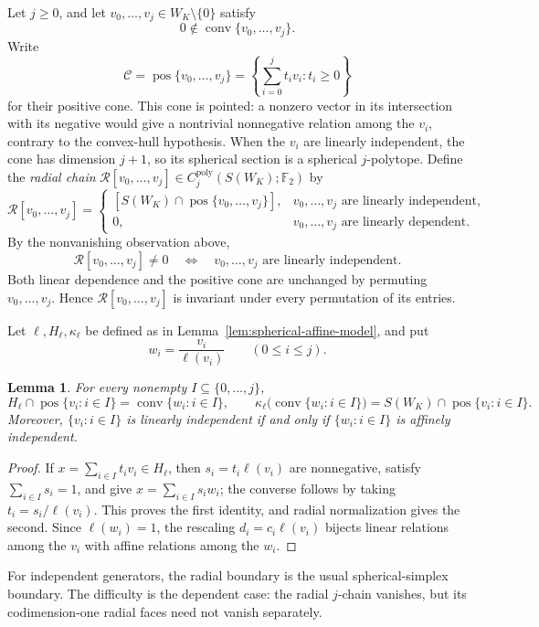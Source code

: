 \documentclass[reqno,12pt]{amsart}
\newtheorem{lemma}[theorem]{Lemma}
\theoremstyle{definition}
\DeclareMathOperator{\conv}{conv}
\DeclareMathOperator{\pos}{pos}
\newcommand{\F}{\mathbb F_2}
\begin{document}
Let \(j\geq0\), and let
\(v_0,\ldots,v_j\in W_K\setminus\{0\}\) satisfy
\[
 0\notin\conv\{v_0,\ldots,v_j\}.
\]
Write
\[
\mathcal C=\pos\{v_0,\ldots,v_j\}
 =\left\{\sum_{i=0}^jt_iv_i:t_i\geq0\right\}
\]
for their positive cone.  This cone is pointed: a nonzero vector in its
intersection with its negative would give a nontrivial nonnegative
relation among the \(v_i\), contrary to the convex-hull hypothesis.
When the \(v_i\) are linearly independent, the cone has dimension
\(j+1\), so its spherical section is a spherical \(j\)-polytope.
Define the \emph{radial chain}
\(\mathcal R[v_0,\ldots,v_j]\in
C_j^{\mathrm{poly}}(S(W_K);\F)\) by
\[
 \mathcal R[v_0,\ldots,v_j]=
 \begin{cases}
 [S(W_K)\cap\pos\{v_0,\ldots,v_j\}],
     &v_0,\ldots,v_j\text{ are linearly independent},\\
 0,&v_0,\ldots,v_j\text{ are linearly dependent}.
 \end{cases}
\]
By the nonvanishing observation above,
\[
 \mathcal R[v_0,\ldots,v_j]\ne0
 \quad\Longleftrightarrow\quad
 v_0,\ldots,v_j\text{ are linearly independent}.
\]
Both linear dependence and the positive cone are unchanged by
permuting \(v_0,\ldots,v_j\).  Hence
\(\mathcal R[v_0,\ldots,v_j]\) is invariant under every permutation of
its entries.

Let \(\ell,H_\ell,\kappa_\ell\) be defined as in Lemma~\ref{lem:spherical-affine-model},
and put
\[
 w_i=\frac{v_i}{\ell(v_i)}\qquad(0\leq i\leq j).
\]

\begin{lemma}
\label{lem:positive-cone-section}
For every nonempty \(I\subseteq\{0,\ldots,j\}\),
\[
 H_\ell\cap\pos\{v_i:i\in I\}=\conv\{w_i:i\in I\},
 \qquad
 \kappa_\ell\bigl(\conv\{w_i:i\in I\}\bigr)
 =S(W_K)\cap\pos\{v_i:i\in I\}.
\]
Moreover, \(\{v_i:i\in I\}\) is linearly independent if and only if
\(\{w_i:i\in I\}\) is affinely independent.
\end{lemma}

\begin{proof}
If \(x=\sum_{i\in I}t_iv_i\in H_\ell\), then
\(s_i=t_i\ell(v_i)\) are nonnegative, satisfy
\(\sum_{i\in I}s_i=1\), and give \(x=\sum_{i\in I}s_iw_i\); the
converse follows by taking \(t_i=s_i/\ell(v_i)\).  This proves the
first identity, and radial normalization gives the second.  Since
\(\ell(w_i)=1\), the rescaling \(d_i=c_i\ell(v_i)\) bijects linear
relations among the \(v_i\) with affine relations among the \(w_i\).
\end{proof}

For independent generators, the radial boundary is the usual
spherical-simplex boundary.  The difficulty is the dependent case:
the radial \(j\)-chain vanishes, but its codimension-one radial faces
need not vanish separately.
\end{document}
